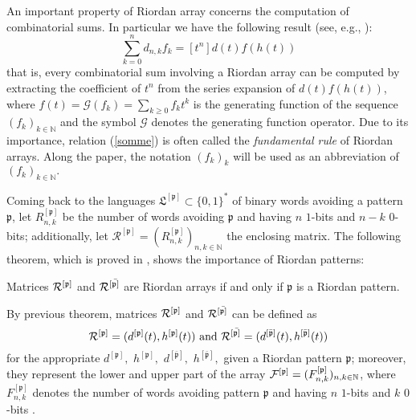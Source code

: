 An important property of Riordan array concerns the computation of
combinatorial sums.  In particular we have the following result (see, e.g.,
\citep{LUZON2012631,Merlini:2009:CSI:2653507.2654195,SPRUGNOLI1994267}):
\begin{equation}
    \label{somme}
    \sum_{k=0}^n d_{n,k}f_k=[t^n]d(t)f(h(t))
\end{equation}
that is, every combinatorial sum involving a Riordan array can be computed by
extracting the coefficient of $t^n$ from the series expansion of $d(t)f(h(t))$,
where $f(t)=\mathcal{G}(f_k)=\sum_{k\geq 0}f_kt^k$ is the generating function of the
sequence $(f_k)_{k \in\mathbb{N}}$ and the symbol $\mathcal{G}$ denotes the generating function
operator. Due to its importance, relation (\ref{somme}) is often called the
\textit{fundamental rule} of Riordan arrays.  Along the paper, the notation
$(f_k)_{k}$ will be used as an abbreviation of $(f_k)_{k\in\mathbb{N}}.$

Coming back to the languages $\mathfrak{L}^{[\mathfrak{p}]}\subset \{0,1\}^*$
of binary words avoiding a pattern $\mathfrak{p}$, let
$R_{n,k}^{[\mathfrak{p}]}$ be the number of words avoiding $\mathfrak{p}$ and
having $n$ $1$-bits  and $n-k$  $0$-bits; additionally, let
$\mathcal{R}^{[\mathfrak{p}]}=\left(R_{n,k}^{[\mathfrak{p}]}\right)_{n,k\in\mathbb{N}}$
the enclosing matrix. The following theorem, which is proved in \citep{MERLINI20112988},
shows the importance of Riordan patterns:
\begin{theorem}
\label{main}
Matrices ${\cal{R}^{[\mathfrak{p}]}}$ and ${\cal{R}^{[\bar{\mathfrak{p}]}}}$
are Riordan arrays if and only if  $\mathfrak{p}$ is a Riordan pattern.
\end{theorem}

By previous theorem, matrices ${\cal{R}^{[\mathfrak{p}]}}$ and
${\cal{R}^{[\bar{\mathfrak{p}]}}}$ can be defined as
$${\cal{R}^{[\mathfrak{p}]}}=(d^{[\mathfrak{p}]}(t),h^{[\mathfrak{p}]}(t)) \text{ and }
{\cal{R}^{[\bar{\mathfrak{p}]}}}=(d^{[\bar{\mathfrak{p}}]}(t),h^{[\bar{\mathfrak{p}}]}(t))$$
for the appropriate $d^{[\mathfrak{p}]},$ $h^{[\mathfrak{p}]},$ $d^{[\bar{\mathfrak{p}}]},$
$h^{[\bar{\mathfrak{p}}]},$ given a Riordan pattern $\mathfrak{p}$; moreover, they represent the lower and
upper part of the array
${\cal{F}^{[\mathfrak{p}]}}=(F_{n,k}^{[\mathfrak{p}]})_{n,k \in \mathbb{N}}$,
where $F_{n,k}^{[\mathfrak{p}]}$ denotes the number of words avoiding pattern
$\mathfrak{p}$ and having $n$ $1$-bits  and $k$ $0$-bits .

